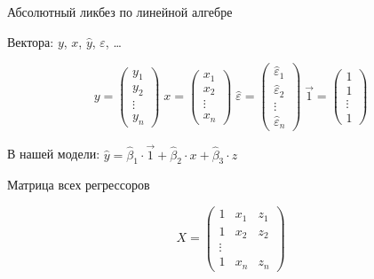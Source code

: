 \documentclass[russian,ignorenonframetext,]{beamer}
\begin{document}
\begin{frame}{Абсолютный ликбез по линейной алгебре}

Вектора: \(y\), \(x\), \(\hat{y}\), \(\varepsilon\), \ldots

\[
y=\begin{pmatrix}
y_1 \\
y_2 \\
\vdots \\
y_n
\end{pmatrix}\;
x=\begin{pmatrix}
x_1 \\
x_2 \\
\vdots \\
x_n
\end{pmatrix}\;
\hat{\varepsilon}=\begin{pmatrix}
\hat{\varepsilon}_1 \\
\hat{\varepsilon}_2 \\
\vdots \\
\hat{\varepsilon}_n
\end{pmatrix}\;
\vec{1}=\begin{pmatrix}
1 \\
1 \\
\vdots \\
1
\end{pmatrix}
\]

В нашей модели:
\(\hat{y}=\hat{\beta}_1 \cdot \vec{1}+\hat{\beta}_2 \cdot x +\hat{\beta}_3 \cdot z\)

\end{frame}

\begin{frame}{Матрица всех регрессоров}

\[
X=\begin{pmatrix}
1 & x_1 & z_1 \\
1 & x_2 & z_2 \\
\vdots \\
1 & x_n & z_n 
\end{pmatrix}
\]

\end{frame}
\end{document}
